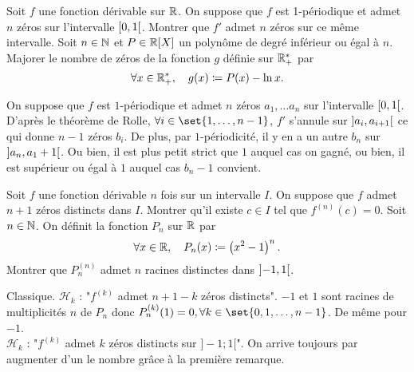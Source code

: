 \documentclass{magnolia}
\begin{document}


\begin{questions}
\question Soit $f$ une fonction dérivable sur $\mathbb{R}$. On suppose que $f$ est
  1-périodique et admet $n$ zéros sur l'intervalle $\left[0,1\right[$. Montrer
  que $f'$ admet $n$ zéros sur ce même intervalle.
\question Soit $n\in\mathbb{N}$ et $P\in\polyR$ un polynôme de degré inférieur ou égal à $n$. Majorer le nombre de zéros de la
  fonction $g$ définie sur $\mathbb{R}_+^*$ par
  \[\forall x\in\mathbb{R}_+^* ,\quad g(x)\coloneqq P(x)-\ln x.\]
\end{questions}

\begin{sol}
\begin{questions}
\question On suppose que $f$ est $1$-périodique et admet $n$ zéros $a_1,\ldots a_n$ sur l'intervalle $\left[0,1\right[$. D'après le théorème de Rolle, $\forall i \in \set{1,\ldots,n-1}$, $f'$ s'annule sur $\left]a_i,a_{i+1}\right[$ ce qui donne $n-1$ zéros $b_i$. De plus, par $1$-périodicité, il y en a un autre $b_n$ sur $\left]a_n,a_1+1\right[$. Ou bien, il est plus petit strict que $1$ auquel cas on gagné, ou bien, il est supérieur ou égal à $1$ auquel cas $b_n-1$ convient. 
\question 
\end{questions}

\end{sol}


\begin{questions}
\question Soit $f$ une fonction dérivable $n$ fois sur un intervalle $I$. On
  suppose que $f$ admet $n+1$ zéros distincts dans $I$. Montrer qu'il existe
  $c\in I$ tel que $f^{(n)}(c)=0$.
\question Soit $n\in\mathbb{N}$. On définit la fonction $P_n$ sur $\mathbb{R}$ par
  \[\forall x\in\mathbb{R} ,\quad P_n(x)\coloneqq\left(x^2-1\right)^n.\]
  Montrer que $P_n^{(n)}$ admet $n$ racines distinctes dans $\left]-1,1\right[$.
\end{questions}

\begin{sol}
\begin{questions}
\question Classique. $\mathcal{H}_k$ : "$f^{(k)}$ admet $n+1-k$ zéros distincts".
\question $-1$ et $1$ sont racines de multiplicités $n$ de $P_n$ donc $P_n^{(k)}(1)=0,  \forall k \in \set{0,1,\ldots,n-1}$. De même pour $-1$.\\
$\mathcal{H}_k$ : "$f^{(k)}$ admet $k$ zéros distincts sur $]-1;1[$". On arrive toujours par augmenter d'un le nombre grâce à la première remarque.
\end{questions}

\end{sol}
\end{document}
